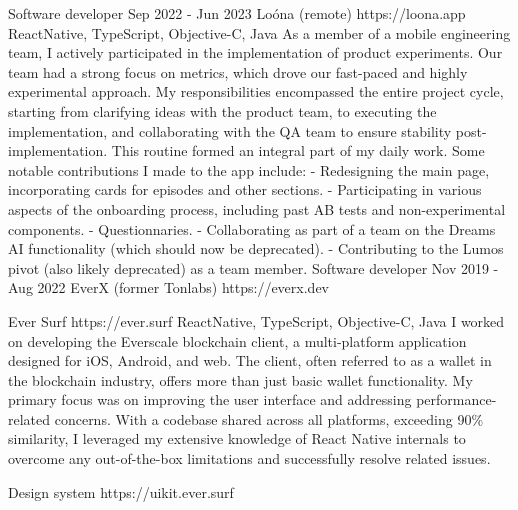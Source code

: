 \documentclass[11pt,a4paper,sans]{awesomecv}
\begin{document}
\begin{cventries}
\cventry
    {Software developer}
    {Sep 2022 - Jun 2023}
    {Loóna (remote)}
    {https://loona.app}
    {
      \cvproject
        {}{}{}
        {ReactNative, TypeScript, Objective-C, Java}
        {
          As a member of a mobile engineering team, 
          I actively participated in the implementation of product experiments. 
          Our team had a strong focus on metrics, which drove our fast-paced and 
          highly experimental approach. 
          My responsibilities encompassed the entire project cycle, 
          starting from clarifying ideas with the product team, 
          to executing the implementation, and collaborating with the QA team to 
          ensure stability post-implementation. This routine formed an integral part of my daily work.
          \hfill \break
          \hfill \break
          Some notable contributions I made to the app include:
          - Redesigning the main page, incorporating cards for episodes and other sections.\hfill \break
          - Participating in various aspects of the onboarding process, including past AB tests and non-experimental components.\hfill \break
          - Questionnaries.\hfill \break
          - Collaborating as part of a team on the Dreams AI functionality (which should now be deprecated).\hfill \break
          - Contributing to the Lumos pivot (also likely deprecated) as a team member.
        }
    }
\cventry
    {Software developer}
    {Nov 2019 - Aug 2022}
    {EverX (former Tonlabs)}
    {https://everx.dev}
    {
      \begin{cvprojects}{0.8ex}
      \item \cvproject
        {Ever Surf}
        {https://ever.surf}{}
        {ReactNative, TypeScript, Objective-C, Java}
        {
          I worked on developing the Everscale blockchain client, 
          a multi-platform application designed for iOS, Android, and web. 
          The client, often referred to as a wallet in the blockchain industry, 
          offers more than just basic wallet functionality. 
          My primary focus was on improving the user interface and addressing 
          performance-related concerns. With a codebase shared across all platforms, 
          exceeding 90\% similarity, I leveraged my extensive knowledge of React Native 
          internals to overcome any out-of-the-box limitations and successfully resolve related issues.
        }
      \item \cvproject
        {Design system}
        {https://uikit.ever.surf}{}

\end{cvprojects}}
\end{cventries}
\end{document}
